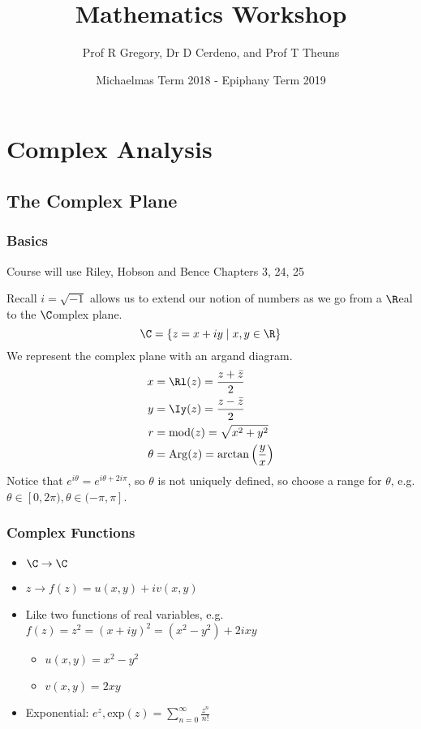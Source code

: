 \documentclass[a4paper, 11pt, normalem]{report}
\title{Mathematics Workshop \vspace{-20pt}}
\author{Prof R Gregory, Dr D Cerdeno, and Prof T Theuns}
\date{\vspace{-15pt}Michaelmas Term 2018 - Epiphany Term 2019}
\begin{document}
\maketitle
\tableofcontents

\part{Complex Analysis}
\chapter{The Complex Plane}
\section{Basics}
Course will use Riley, Hobson and Bence Chapters 3, 24, 25

Recall $i = \sqrt{-1}$ allows us to extend our notion of numbers as we go from a $\R$eal to the $\C$omplex plane.
\begin{equation}
    \C = \{z = x + iy\;|\;x,y \in \R\}
\end{equation}
We represent the complex plane with an argand diagram.
\begin{align}
    x &= \Rl(z) = \frac{z + \bar{z}}{2} \\
    y &= \Iy(z) = \frac{z - \bar{z}}{2} \\
    r &= \mathrm{mod}(z) = \sqrt{x^2 + y^2} \\
    \theta &= \mathrm{Arg}(z) = \arctan\left(\frac{y}{x}\right)
\end{align}
Notice that $e^{i\theta} = e^{i\theta + 2i\pi}$, so $\theta$ is not uniquely defined, so choose a range for $\theta$, e.g. $\theta \in [0, 2\pi), \theta \in (-\pi,\pi]$.

\section{Complex Functions}
\begin{itemize}
    \item $\C \to \C$
    \item $z \to f(z) = u(x,y) + iv(x,y)$
    \item Like two functions of real variables, e.g. $f(z) = z^2 = (x + iy)^2 = (x^2 - y^2) + 2ixy$
    \begin{itemize}
        \item $u(x,y) = x^2 - y^2$
        \item $v(x,y) = 2xy$
    \end{itemize}
\item Exponential: $e^z, \mathrm{exp}(z) = \sum_{n=0}^{\infty} \frac{z^n}{n!}$
\end{itemize}
\end{document}
